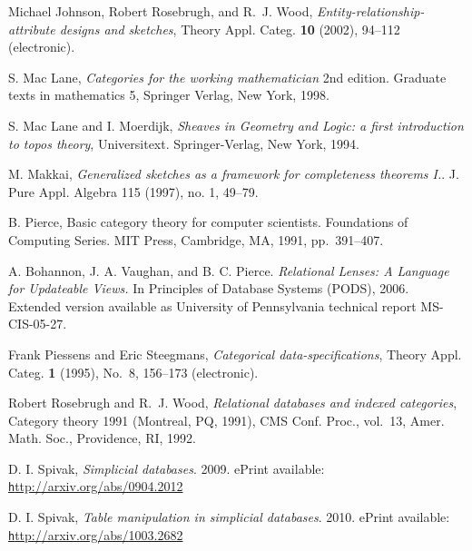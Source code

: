 \documentclass{amsart}
\theoremstyle{remark}
\theoremstyle{definition}
\begin{document}
\begin{thebibliography}{JTT}
Michael Johnson, Robert Rosebrugh, and R.~J. Wood,
  \emph{Entity-relationship-attribute designs and sketches}, Theory Appl.
  Categ. \textbf{10} (2002), 94--112 (electronic).

 S. Mac Lane, {\em Categories for the working mathematician} 2nd edition.  Graduate texts in mathematics 5, Springer Verlag, New York, 1998.

 S. Mac Lane and I. Moerdijk, {\em Sheaves in Geometry and Logic: a first introduction to topos theory}, Universitext.  Springer-Verlag, New York, 1994. 

 M. Makkai, {\em Generalized sketches as a framework for completeness theorems I.}. J. Pure Appl. Algebra 115 (1997), no. 1, 49--79. 

 B. Pierce, Basic category theory for computer scientists. 
Foundations of Computing Series. MIT Press, Cambridge, MA, 1991, pp.~391--407.

 A. Bohannon, J. A. Vaughan, and B. C. Pierce.  {\em Relational Lenses: A Language for Updateable Views.}  In Principles of Database Systems (PODS), 2006. Extended version available as University of Pennsylvania technical report MS-CIS-05-27.

Frank Piessens and Eric Steegmans, \emph{Categorical data-specifications},
  Theory Appl. Categ. \textbf{1} (1995), No.\ 8, 156--173 (electronic).

  Robert Rosebrugh and R.~J. Wood, \emph{Relational databases and indexed categories}, Category theory 1991 ({M}ontreal, {PQ}, 1991), CMS Conf. Proc., vol.~13, Amer. Math. Soc., Providence, RI, 1992.


 D. I. Spivak, {\em Simplicial databases}.  2009.  ePrint available: \href{http://arxiv.org/abs/0904.2012}{\texttt http://arxiv.org/abs/0904.2012}

 D. I. Spivak, {\em Table manipulation in simplicial databases}.  2010.  ePrint available: \href{http://arxiv.org/abs/1003.2682}{\texttt http://arxiv.org/abs/1003.2682}

\end{thebibliography}
\end{document}
